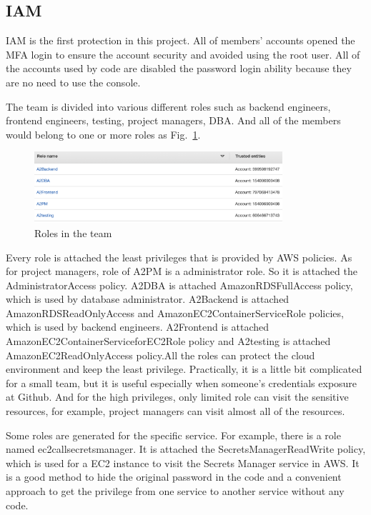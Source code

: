 \documentclass[conference]{IEEEtran}
\begin{document}
\subsection{IAM}

IAM is the first protection in this project. All of members' accounts opened the MFA login to ensure the account security and avoided using the root user. 
All of the accounts used by code are disabled the password login ability because they are no need to use the console. 

The team is divided into various different roles such as backend engineers, frontend engineers, 
testing, project managers, DBA. And all of the members would belong to one or more roles as Fig.~\ref{roles}. 

\begin{figure}[htbp]
    \centerline{\includegraphics[width=260pt]{images/roles.png}}
    \caption{Roles in the team}
    \label{roles}
\end{figure}


Every role is attached the least privileges that is provided by AWS policies. As for project managers, role of A2PM is a administrator role. So it is 
attached the AdministratorAccess policy. A2DBA is attached AmazonRDSFullAccess policy, which is used by database administrator. A2Backend is attached 
AmazonRDSReadOnlyAccess and AmazonEC2ContainerServiceRole policies, which is used by backend engineers. A2Frontend is attached AmazonEC2ContainerServiceforEC2Role 
policy and A2testing is attached AmazonEC2ReadOnlyAccess policy.All the roles can protect the cloud environment and keep the least privilege. Practically, it is 
a little bit complicated for a small team, but it is useful especially when someone's credentials exposure at Github. And for the high privileges, only 
limited role can visit the sensitive resources, for example, project managers can visit almost all of the resources.

Some roles are generated for the specific service. For example, there is a role named ec2callsecretsmanager. It is attached the SecretsManagerReadWrite 
policy, which is used for a EC2 instance to visit the Secrets Manager service in AWS. It is a good method to hide the original password in the code and a 
convenient approach to get the privilege from one service to another service without any code.
\end{document}
